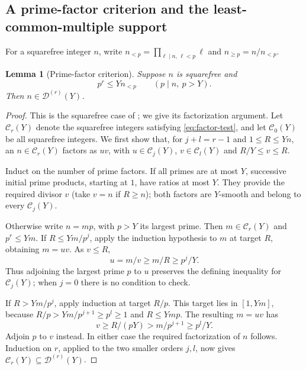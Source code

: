 \documentclass[11pt,a4paper]{article}
\newtheorem{lemma}[theorem]{Lemma}
\theoremstyle{definition}\newtheorem{definition}[theorem]{Definition}
\theoremstyle{remark}\newtheorem{remark}[theorem]{Remark}
\numberwithin{equation}{section}
\begin{document}
\subsection{A prime-factor criterion and the least-common-multiple support}
For a squarefree integer $n$, write $n_{<p}=\prod_{\ell\mid n,\,\ell<p}\ell$ and $n_{\ge p}=n/n_{<p}$.
\begin{lemma}[Prime-factor criterion]\label{lem:factor-test}
Suppose $n$ is squarefree and
\begin{equation}\label{eq:factor-test}
 p^r\le Y n_{<p}\qquad(p\mid n,\ p>Y).
\end{equation}
Then $n\in\mathcal D^{(r)}(Y)$.
\end{lemma}
\begin{proof}
This is the squarefree case of \cite[Theorem~2]{sarajian}; we give its factorization argument. Let $\mathcal C_r(Y)$ denote the squarefree integers satisfying \eqref{eq:factor-test}, and let $\mathcal C_0(Y)$ be all squarefree integers. We first show that, for $j+l=r-1$ and $1\le R\le Yn$, an $n\in\mathcal C_r(Y)$ factors as $uv$, with $u\in\mathcal C_j(Y)$, $v\in\mathcal C_l(Y)$ and $R/Y\le v\le R$.

Induct on the number of prime factors. If all primes are at most $Y$, successive initial prime products, starting at $1$, have ratios at most $Y$. They provide the required divisor $v$ (take $v=n$ if $R\ge n$); both factors are $Y$-smooth and belong to every $\mathcal C_j(Y)$.

Otherwise write $n=mp$, with $p>Y$ its largest prime. Then $m\in\mathcal C_r(Y)$ and $p^r\le Ym$. If $R\le Ym/p^j$, apply the induction hypothesis to $m$ at target $R$, obtaining $m=uv$. As $v\le R$,
\[
 u=m/v\ge m/R\ge p^j/Y.
\]
Thus adjoining the largest prime $p$ to $u$ preserves the defining inequality for $\mathcal C_j(Y)$; when $j=0$ there is no condition to check.

If $R>Ym/p^j$, apply induction at target $R/p$. This target lies in $[1,Ym]$, because $R/p>Ym/p^{j+1}\ge p^l\ge1$ and $R\le Ymp$. The resulting $m=uv$ has
\[
 v\ge R/(pY)>m/p^{j+1}\ge p^l/Y.
\]
Adjoin $p$ to $v$ instead. In either case the required factorization of $n$ follows. Induction on $r$, applied to the two smaller orders $j,l$, now gives $\mathcal C_r(Y)\subseteq\mathcal D^{(r)}(Y)$.
\end{proof}
\end{document}
